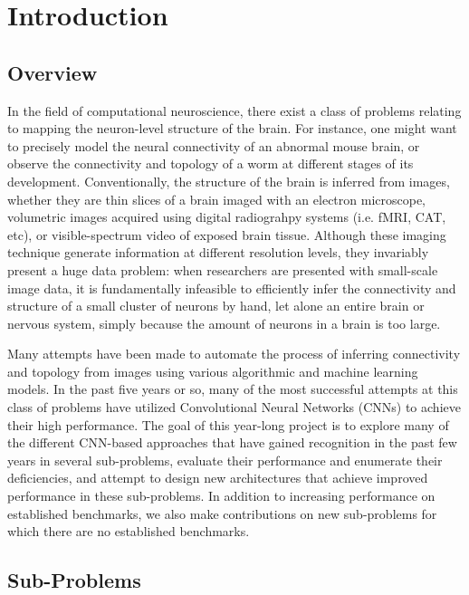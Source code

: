 \section{Introduction}

\subsection{Overview}

In the field of computational neuroscience, there exist a class of problems relating to mapping the neuron-level structure of the brain. For instance, one might want to precisely model the neural connectivity of an abnormal mouse brain, or observe the connectivity and topology of a worm at different stages of its development. Conventionally, the structure of the brain is inferred from images, whether they are thin slices of a brain imaged with an electron microscope, volumetric images acquired using digital radiograhpy systems (i.e. fMRI, CAT, etc), or visible-spectrum video of exposed brain tissue. Although these imaging technique generate information at different resolution levels, they invariably present a huge data problem: when researchers are presented with small-scale image data, it is fundamentally infeasible to efficiently infer the connectivity and structure of a small cluster of neurons by hand, let alone an entire brain or nervous system, simply because the amount of neurons in a brain is too large.

Many attempts have been made to automate the process of inferring connectivity and topology from images using various algorithmic and machine learning models. In the past five years or so, many of the most successful attempts at this class of problems have utilized Convolutional Neural Networks (CNNs) to achieve their high performance. The goal of this year-long project is to explore many of the different CNN-based approaches that have gained recognition in the past few years in several sub-problems, evaluate their performance and enumerate their deficiencies, and attempt to design new architectures that achieve improved performance in these sub-problems. In addition to increasing performance on established benchmarks, we also make contributions on new sub-problems for which there are no established benchmarks.

\subsection{Sub-Problems}


